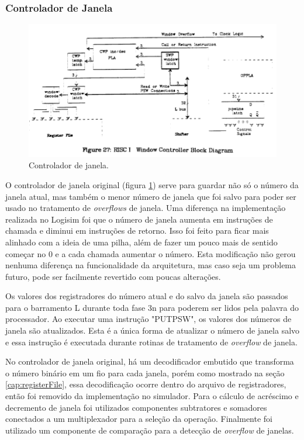 \documentclass[
	article,			%
	11pt,				%
	oneside,			%
	a4paper,			%
	english,			%
	brazil,				%
	sumario=tradicional
	]{abntex2}
\begin{document}
\subsubsection{Controlador de Janela}
\begin{figure}[H]
    \centering
    \includegraphics[width=0.75\linewidth]{Original/windowControllerPeek.png}
    \caption{Controlador de janela\cite{peek_vlsi_1983}.}
    \label{fig:windowControllerPeek}
\end{figure}
O controlador de janela original (figura \ref{fig:windowControllerPeek}) serve para guardar não só o número da janela atual, mas também o menor número de janela que foi salvo para poder ser usado no tratamento de \textit{overflows} de janela. Uma diferença na implementação realizada no Logisim foi que o número de janela aumenta em instruções de chamada e diminui em instruções de retorno. Isso foi feito para ficar mais alinhado com a ideia de uma pilha, além de fazer um pouco mais de sentido começar no 0 e a cada chamada aumentar o número. Esta modificação não gerou nenhuma diferença na funcionalidade da arquitetura, mas caso seja um problema futuro, pode ser facilmente revertido com poucas alterações.

Os valores dos registradores do número atual e do salvo da janela são passados para o barramento L durante toda fase 3n para poderem ser lidos pela palavra do processador. Ao executar uma instrução "PUTPSW", os valores dos números de janela são atualizados. Esta é a única forma de atualizar o número de janela salvo e essa instrução é executada durante rotinas de tratamento de \textit{overflow} de janela.

No controlador de janela original, há um decodificador embutido que transforma o número binário em um fio para cada janela, porém como mostrado na seção \ref{cap:registerFile}, essa decodificação ocorre dentro do arquivo de registradores, então foi removido da implementação no simulador. Para o cálculo de acréscimo e decremento de janela foi utilizados componentes subtratores e somadores conectados a um multiplexador para a seleção da operação. Finalmente foi utilizado um componente de comparação para a detecção de \textit{overflow} de janelas.
\end{document}
